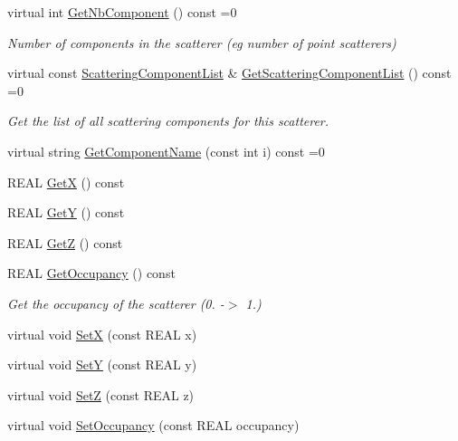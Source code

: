 \begin{DoxyCompactItemize}
virtual int \mbox{\hyperlink{class_obj_cryst_1_1_scatterer_a18d63b8e79b35942902244c555ea33ef}{Get\+Nb\+Component}} () const =0
\begin{DoxyCompactList}\small\item\em Number of components in the scatterer (eg number of point scatterers) \end{DoxyCompactList}\item 
virtual const \mbox{\hyperlink{class_obj_cryst_1_1_scattering_component_list}{Scattering\+Component\+List}} \& \mbox{\hyperlink{class_obj_cryst_1_1_scatterer_aca0e08e3793cc69d31fce53e481c2a67}{Get\+Scattering\+Component\+List}} () const =0
\begin{DoxyCompactList}\small\item\em Get the list of all scattering components for this scatterer. \end{DoxyCompactList}\item 
virtual string \mbox{\hyperlink{class_obj_cryst_1_1_scatterer_a42bdf508da6a90859a5a61e16c27d47e}{Get\+Component\+Name}} (const int i) const =0
\item 
R\+E\+AL \mbox{\hyperlink{class_obj_cryst_1_1_scatterer_aa46e022b2ea81079b4d02da07b6bec4a}{GetX}} () const
\item 
R\+E\+AL \mbox{\hyperlink{class_obj_cryst_1_1_scatterer_aeebaad938c35a825e78cf49a5fba5d3c}{GetY}} () const
\item 
R\+E\+AL \mbox{\hyperlink{class_obj_cryst_1_1_scatterer_ac1d8f78fc091087c13664b6186923616}{GetZ}} () const
\item 
R\+E\+AL \mbox{\hyperlink{class_obj_cryst_1_1_scatterer_a6c063b27354d3885006a118de9816d69}{Get\+Occupancy}} () const
\begin{DoxyCompactList}\small\item\em Get the occupancy of the scatterer (0. -\/$>$ 1.) \end{DoxyCompactList}\item 
virtual void \mbox{\hyperlink{class_obj_cryst_1_1_scatterer_aff5316d7c3bdfe1122c7182a5fa74c55}{SetX}} (const R\+E\+AL x)
\item 
virtual void \mbox{\hyperlink{class_obj_cryst_1_1_scatterer_a4be726a73ee8c60ed3d2efbcdbddec0b}{SetY}} (const R\+E\+AL y)
\item 
virtual void \mbox{\hyperlink{class_obj_cryst_1_1_scatterer_a4b37d00a337253b810700e068046c6ec}{SetZ}} (const R\+E\+AL z)
\item 
virtual void \mbox{\hyperlink{class_obj_cryst_1_1_scatterer_af861980515d2f0c1f2f4164e7a30359a}{Set\+Occupancy}} (const R\+E\+AL occupancy)

\end{DoxyCompactItemize}

